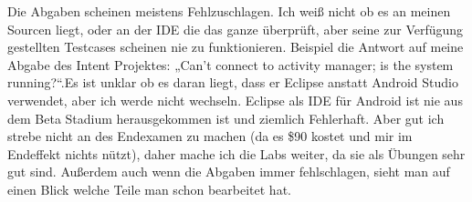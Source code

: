 \documentclass[12pt,a4paper,bibliography=totocnumbered,listof=totocnumbered]{scrartcl}
\begin{document}
Die Abgaben scheinen meistens Fehlzuschlagen. Ich weiß nicht ob es an meinen Sourcen liegt, oder an der IDE die das ganze überprüft, aber seine zur Verfügung gestellten Testcases scheinen nie zu funktionieren. Beispiel die Antwort auf meine Abgabe des Intent Projektes: „Can't connect to activity manager; is the system running?“.Es ist unklar ob es daran liegt, dass er Eclipse anstatt Android Studio verwendet, aber ich werde nicht wechseln. Eclipse als IDE für Android ist nie aus dem Beta Stadium herausgekommen ist und ziemlich Fehlerhaft. Aber gut ich strebe nicht an des Endexamen zu machen (da es \$90 kostet und mir im Endeffekt nichts nützt), daher mache ich die Labs weiter, da sie als Übungen sehr gut sind. Außerdem auch wenn die Abgaben immer fehlschlagen, sieht man auf einen Blick welche Teile man schon bearbeitet hat. 
\end{document}
